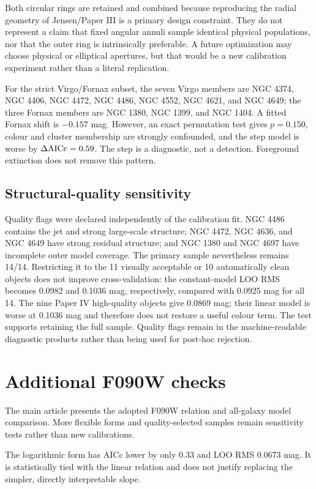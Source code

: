 \documentclass[nodoi,nocopyright]{pas}
\begin{document}
Both circular rings are retained and combined because reproducing the radial
geometry of Jensen/Paper III is a primary design constraint. They do not
represent a claim that fixed angular annuli sample identical physical
populations, nor that the outer ring is intrinsically preferable. A future
optimization may choose physical or elliptical apertures, but that would be a
new calibration experiment rather than a literal replication.


For the strict Virgo/Fornax subset, the seven Virgo members are NGC 4374,
NGC 4406, NGC 4472, NGC 4486, NGC 4552, NGC 4621, and NGC 4649; the three
Fornax members are NGC 1380, NGC 1399, and NGC 1404. A fitted Fornax shift is
$-0.157$ mag. However, an exact permutation test gives $p=0.150$, colour and
cluster membership are strongly confounded, and the step model is worse by
$\Delta{\rm AICc}=0.59$. The step is a diagnostic, not a detection. Foreground
extinction does not remove this pattern.

\subsection{Structural-quality sensitivity}

Quality flags were declared independently of the calibration fit. NGC 4486
contains the jet and strong large-scale structure; NGC 4472, NGC 4636, and
NGC 4649 have strong residual structure; and NGC 1380 and NGC 4697 have
incomplete outer model coverage. The primary sample nevertheless remains
14/14. Restricting it to the 11 visually acceptable or 10 automatically clean
objects does not improve cross-validation: the constant-model LOO RMS becomes
0.0982 and 0.1036 mag, respectively, compared with 0.0925 mag for all 14.
The nine Paper IV high-quality objects give 0.0869 mag; their linear model is
worse at 0.1036 mag and therefore does not restore a useful colour term. The
test supports retaining the full sample. Quality flags remain in the
machine-readable diagnostic products rather than being used for post-hoc
rejection.


\section{Additional F090W checks}
\label{sec:notes-f090}
The main article presents the adopted F090W relation and all-galaxy
model comparison. More flexible forms and quality-selected samples remain
sensitivity tests rather than new calibrations.

The logarithmic form has AICc lower by only 0.33 and
LOO RMS 0.0673 mag. It is statistically tied with the linear relation and
does not justify replacing the simpler, directly interpretable slope.
\end{document}
